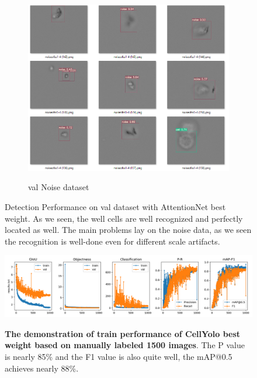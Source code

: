 \begin{figure}[t]
\begin{center}
\begin{subfigure}[c]{0.6\textwidth}
			\includegraphics[width=\textwidth]{thesis-template-master/images/An illustration test performance of CellYolo best weight2.png}
			\label{fig:Out of Focus}
			\caption{val Noise dataset}
		\end{subfigure}
		
	\end{center}
	\caption{ Detection Performance on val dataset with AttentionNet best weight. As we seen, the well cells are well recognized and perfectly located as well. The main problems lay on the noise data, as we seen the recognition is well-done even for different scale artifacts.}
	\label{fig:lennas}
\end{figure}

\begin{figure}[h]
\begin{center}
\includegraphics[width=\textwidth]{thesis-template-master/images/cellyolo best weight based on manually labeled 1500 images.png}
\label{fig:cellnet}
\end{center}
\caption{\textbf{The demonstration of train performance of CellYolo best weight based on manually labeled 1500 images}. The P value is nearly 85\% and the F1 value is also quite well, the mAP@0.5 achieves nearly 88\%.}
\end{figure}

